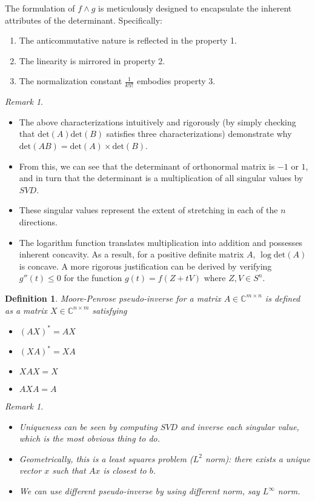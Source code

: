 \documentclass{article}
\newtheorem{definition}{Definition}
\theoremstyle{remark}
\newtheorem{remark}[example]{Remark}
\begin{document}
  The formulation of $f\wedge g$ is meticulously designed to 
  encapsulate the inherent attributes of the determinant. Specifically:
  \begin{enumerate}
    \item The anticommutative nature is reflected in the property 1.
    \item The linearity is mirrored in property 2.
    \item The normalization constant $\frac{1}{k!l!}$ embodies property 3.
  \end{enumerate}
\begin{remark}
\begin{itemize}
 \item The above characterizations intuitively and rigorously (by simply checking that $\text{det}(A)\text{det}(B)$ satisfies three characterizations) demonstrate why $ \text{det}(AB) = \text{det}(A) \times \text{det}(B) $.
 \item From this, we can see that the determinant of orthonormal matrix is $-1$ or $1$, and in turn that the determinant is a multiplication of all singular values by $SVD$.
 \item These singular values represent the extent of stretching in each of the \( n \) directions.
 \item The logarithm function translates multiplication into addition and possesses inherent concavity. As a result, for a positive definite matrix \( A \), \( \log \text{det}(A) \) is concave. A more rigorous justification can be derived by verifying \( g''(t) \leq 0 \) for 
 the function \( g(t) = f(Z + tV) \) where \( Z, V \in S^n \).
\end{itemize}
\end{remark}
\begin{definition}
Moore-Penrose pseudo-inverse for a matrix $A\in \mathbb{C}^{m\times n}$ is defined as a matrix $X\in\mathbb{C}^{n\times m}$ satisfying
\begin{itemize}
\item $(AX)^*=AX$
\item $(XA)^* = XA$
\item $XAX=X$
\item $AXA=A$
\end{itemize}
\begin{remark}
\begin{itemize}
\item Uniqueness can be seen by computing $SVD$ and inverse each singular value, which is the most obvious thing to do.
\item Geometrically, this is a least squares problem ($L^2$ norm): there exists a unique vector $x$ such that $Ax$ is closest to $b$.
\item We can use different pseudo-inverse by using different norm, say $L^\infty$ norm.

\end{itemize}
\end{remark}
\end{definition}
\end{document}
